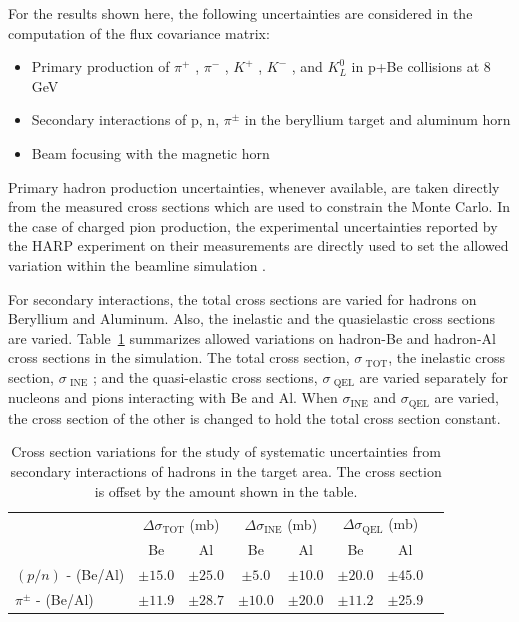 For the results shown here, the following uncertainties are considered in the computation of the flux covariance matrix:

\begin{itemize}
\item Primary production of $\pi^+$ , $\pi^-$ , $K^+$ , $K^−$ , and $K_L^0$ in p+Be collisions at 8 GeV
\item Secondary interactions of p, n, $\pi^{\pm}$ in the beryllium target and aluminum horn
\item Beam focusing with the magnetic horn
\end{itemize}

Primary hadron production uncertainties, whenever available, are taken directly from the
measured cross sections which are used to constrain the Monte Carlo. In the case
of charged pion production, the experimental uncertainties reported by the HARP experiment on
their measurements are directly used to set the allowed variation within the beamline simulation \cite{Catanesi:2007ab}.

For secondary interactions, the total cross sections are varied for hadrons on Beryllium and Aluminum.  Also, the inelastic and the quasielastic cross sections are varied.  Table~\ref{tab:flux_secondary_int_variations} summarizes allowed variations on hadron-Be and hadron-Al cross sections in the simulation. The total cross section, $\sigma_{\text{~TOT}}$, the inelastic cross section, $\sigma_{\text{~INE}}$ ; and the quasi-elastic cross sections, $\sigma_{\text{~QEL}}$ are varied separately for nucleons and pions interacting with Be and Al. When $\sigma_{\text{INE}}$ and $\sigma_{\text{QEL}}$ are varied, the cross section of the other is changed to hold the total cross section constant.

\begin{table}[h]
  \caption[BNB Secondary Interaction Variations]{Cross section variations for the study of systematic uncertainties from secondary interactions of hadrons in the target area.  The cross section is offset by the amount shown in the table.}
  \label{tab:flux_secondary_int_variations}
  \centering
  \begin{tabular}{l|ccccccc}
  \hline
  \hline
   &  \multicolumn{2}{c}{$\Delta \sigma_{\text{TOT}}$ (mb)} & \multicolumn{2}{c}{$\Delta \sigma_{\text{INE}}$ (mb)} & \multicolumn{2}{c}{$\Delta \sigma_{\text{QEL}}$ (mb)} \\
   &  Be & Al & Be & Al & Be & Al \\
  \hline
   $(p/n)$ - (Be/Al) & $\pm 15.0$ & $\pm 25.0$ & $\pm 5.0$ & $\pm 10.0$ & $\pm 20.0$ & $\pm 45.0$ \\
   $\pi^{\pm}$ - (Be/Al) & $\pm 11.9$ & $\pm 28.7$ & $\pm 10.0$ & $\pm 20.0$ & $\pm 11.2$ & $\pm 25.9$ \\
  \hline
  \end{tabular}
\end{table}

